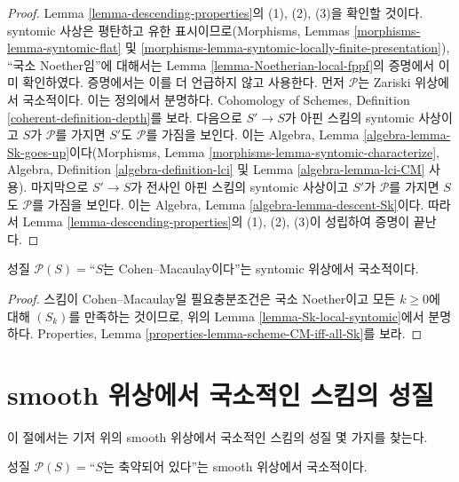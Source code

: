 \begin{proof}
Lemma \ref{lemma-descending-properties}의 (1), (2), (3)을 확인할 것이다.
syntomic 사상은 평탄하고 유한 표시이므로(Morphisms, Lemmas
\ref{morphisms-lemma-syntomic-flat} 및
\ref{morphisms-lemma-syntomic-locally-finite-presentation}), ``국소
Noether임''에 대해서는 Lemma \ref{lemma-Noetherian-local-fppf}의 증명에서
이미 확인하였다. 증명에서는 이를 더 언급하지 않고 사용한다. 먼저
$\mathcal{P}$는 Zariski 위상에서 국소적이다. 이는 정의에서 분명하다.
Cohomology of Schemes, Definition \ref{coherent-definition-depth}를 보라.
다음으로 $S' \to S$가 아핀 스킴의 syntomic 사상이고 $S$가
$\mathcal{P}$를 가지면 $S'$도 $\mathcal{P}$를 가짐을 보인다. 이는
Algebra, Lemma \ref{algebra-lemma-Sk-goes-up}이다(Morphisms, Lemma
\ref{morphisms-lemma-syntomic-characterize}, Algebra, Definition
\ref{algebra-definition-lci} 및 Lemma \ref{algebra-lemma-lci-CM} 사용).
마지막으로 $S' \to S$가 전사인 아핀 스킴의 syntomic 사상이고 $S'$가
$\mathcal{P}$를 가지면 $S$도 $\mathcal{P}$를 가짐을 보인다. 이는
Algebra, Lemma \ref{algebra-lemma-descent-Sk}이다. 따라서 Lemma
\ref{lemma-descending-properties}의 (1), (2), (3)이 성립하여 증명이 끝난다.
\end{proof}

\begin{lemma}
\label{lemma-CM-local-syntomic}
성질 $\mathcal{P}(S) =$``$S$는 Cohen--Macaulay이다''는 syntomic 위상에서
국소적이다.
\end{lemma}

\begin{proof}
스킴이 Cohen--Macaulay일 필요충분조건은 국소 Noether이고 모든
$k \geq 0$에 대해 $(S_k)$를 만족하는 것이므로, 위의 Lemma
\ref{lemma-Sk-local-syntomic}에서 분명하다. Properties, Lemma
\ref{properties-lemma-scheme-CM-iff-all-Sk}를 보라.
\end{proof}







\section{smooth 위상에서 국소적인 스킴의 성질}
\label{section-descending-properties-smooth}

\noindent
이 절에서는 기저 위의 smooth 위상에서 국소적인 스킴의 성질 몇 가지를
찾는다.

\begin{lemma}
\label{lemma-reduced-local-smooth}
성질 $\mathcal{P}(S) =$``$S$는 축약되어 있다''는 smooth 위상에서
국소적이다.
\end{lemma}

